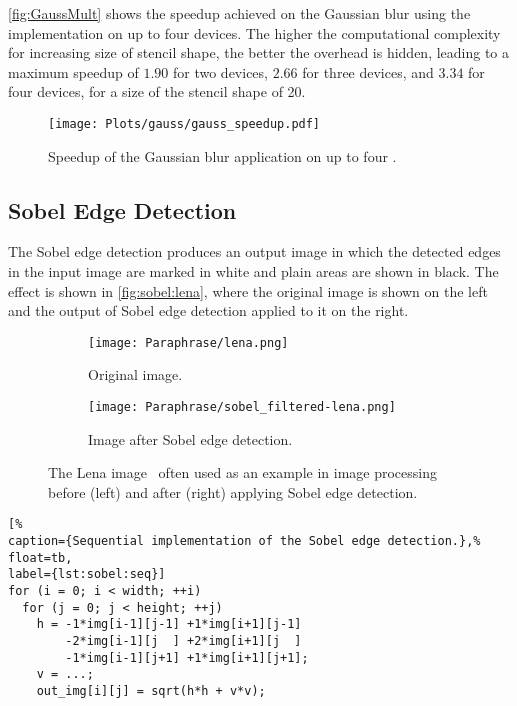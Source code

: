 \autoref{fig:GaussMult} shows the speedup achieved on the Gaussian blur using the  implementation on up to four devices.
The higher the computational complexity for increasing size of stencil shape, the better the overhead is hidden, leading to a maximum speedup of $1.90$ for two devices, $2.66$ for three devices, and $3.34$ for four devices, for a size of the stencil shape of 20.
\begin{figure}
	\centering
	\texttt{[image: Plots/gauss/gauss\_speedup.pdf]}
	\caption{Speedup of the Gaussian blur application on up to four \GPUs.}
	\label{fig:GaussMult}
\end{figure} 










\subsection{Sobel Edge Detection}
\label{sec:sobel}
The Sobel edge detection produces an output image in which the detected edges in the input image are marked in white and plain areas are shown in black.
The effect is shown in \autoref{fig:sobel:lena}, where the original image is shown on the left and the output of Sobel edge detection applied to it on the right.

\begin{figure}[tb]
  \centering
  \begin{subfigure}[t]{.45\textwidth}
    \texttt{[image: Paraphrase/lena.png]}
    \caption{Original image.}
    \label{fig:lena:orig}
  \end{subfigure}
  \hfill
  \begin{subfigure}[t]{.45\textwidth}
    \texttt{[image: Paraphrase/sobel\_filtered-lena.png]}
    \caption{Image after Sobel edge detection.}
    \label{fig:lena:sobel}
  \end{subfigure}
  \caption[The Lena image before and after applying Sobel edge detection.]%
          {The Lena image~\cite{Lena} often used as an example in image processing before (left) and after (right) applying Sobel edge detection.}
  \label{fig:sobel:lena}
\end{figure}

\begin{lstlisting}[%
caption={Sequential implementation of the Sobel edge detection.},%
float=tb,
label={lst:sobel:seq}]
for (i = 0; i < width; ++i)
  for (j = 0; j < height; ++j)
    h = -1*img[i-1][j-1] +1*img[i+1][j-1]
        -2*img[i-1][j  ] +2*img[i+1][j  ]
        -1*img[i-1][j+1] +1*img[i+1][j+1];
    v = ...;
    out_img[i][j] = sqrt(h*h + v*v);
\end{lstlisting}
\bigskip

